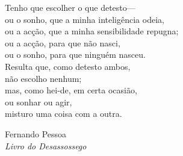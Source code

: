 \setlength{\epigraphwidth}{0.58\textwidth}
\setlength{\epigraphrule}{0pt}
\thispagestyle{empty}
\null{}
\epigraph{Tenho que escolher o que detesto---\\
  ou o sonho, que a minha inteligência odeia,\\
  ou a acção, que a minha sensibilidade repugna;\\
  ou a acção, para que não nasci,\\
  ou o sonho, para que ninguém nasceu.\\
  Resulta que, como detesto ambos,\\
  não escolho nenhum;\\
  mas, como hei-de, em certa ocasião,\\
  ou sonhar ou agir,\\
  misturo uma coisa com a outra.\\
}{Fernando Pessoa\\ \emph{Livro do Desassossego}}
\null

